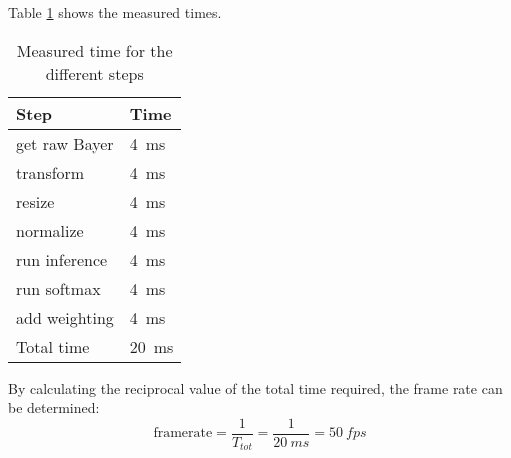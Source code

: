 Table \ref{tab:measured_times} shows the measured times.

\begin{table}[hb]
	\caption{Measured time for the different steps}
	\label{tab:measured_times}
	\centering
	\begin{tabular}{ll}
		\toprule
		\textbf{Step} & \textbf{Time} \\
		\midrule
		get raw Bayer & \SI{4}{ms} \\
		transform & \SI{4}{ms} \\
		resize & \SI{4}{ms} \\
		normalize & \SI{4}{ms} \\
		run inference & \SI{4}{ms} \\
		run softmax & \SI{4}{ms} \\
		add weighting & \SI{4}{ms} \\
		\midrule
		Total time & \SI{20}{ms} \\
		\bottomrule
	\end{tabular}
\end{table}

By calculating the reciprocal value of the total time required, the frame rate can be determined:
\begin{equation}
  \text{framerate} = \frac{1}{T_{tot}} = \frac{1}{\SI{20}{ms}} = \SI{50}{fps}
  \label{eq:achieved_framerate}
\end{equation}
